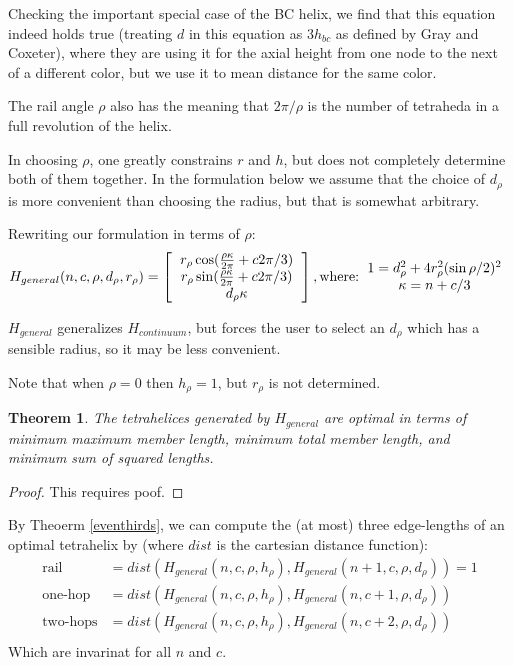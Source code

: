 \documentclass[11pt]{article}
\newtheorem{theorem}{Theorem}
\begin{document}
Checking the important special case of the BC helix, we find that this equation
indeed holds true (treating $d$ in this equation as $3 h_{bc}$ as defined by
Gray and Coxeter), where they are using it for the axial height from one node to
the next of a different color, but we use it to mean distance for the same color.

The rail angle $\rho$ also has the meaning that $2 \pi / \rho$ is the number of
tetraheda in a full revolution of the helix.

In choosing $\rho$, one greatly constrains $r$ and $h$, but does not completely
determine both of them together. In the formulation below we assume that
the choice of $d_{\rho}$ is more convenient than choosing the radius,
but that is somewhat arbitrary.


Rewriting our formulation in terms of $\rho$:
\[
H_{general}(n,c,\rho,d_{\rho},r_{\rho}) =
\left [
  \begin{tabular}{c}
   $ r_{\rho} \cos(\frac{\rho \kappa}{2\pi} + c 2 \pi /3) $\\
   $ r_{\rho}  \sin(\frac{\rho \kappa}{2\pi} + c 2 \pi /3) $\\
   $ d_{\rho} \kappa $
  \end{tabular}
  \right ],
\text{where:}
\begin{tabular}{c}
  $   1 = d_{\rho}^2 + 4 r_{\rho}^2 (\sin{ \rho / 2})^2 $ \\
    $\kappa = n + c/3$ \\
  \end{tabular}      
\]

$H_{general}$ generalizes $H_{continuum}$, but forces the user to select an $d_{\rho}$
which has a sensible radius, so it may be less convenient.

Note that when $\rho = 0$ then $h_{\rho} = 1$, but $r_{\rho}$ is not determined.

\begin{theorem}
  \label{generalformulaoptimal}
  The tetrahelices generated by $H_{general}$ are optimal in terms of minimum maximum member length, minimum total member length, and minimum
  sum of squared lengths.
\end{theorem}


\begin{proof}
  This requires poof.
\end{proof}

By Theoerm \ref{eventhirds}, we can compute the (at most) three edge-lengths of an optimal
tetrahelix by (where $dist$ is the cartesian distance function):
\begin{align*}
  \text{rail} &= dist(H_{general}(n,c,\rho,h_{\rho}),H_{general}(n+1,c,\rho,d_{\rho})) = 1 \\
  \text{one-hop} &= dist(H_{general}(n,c,\rho,h_{\rho}),H_{general}(n,c+1,\rho,d_{\rho}))  \\
  \text{two-hops} &= dist(H_{general}(n,c,\rho,h_{\rho}),H_{general}(n,c+2,\rho,d_{\rho}))  \\  
\end{align*}
Which are invarinat for all $n$ and $c$.
\end{document}
